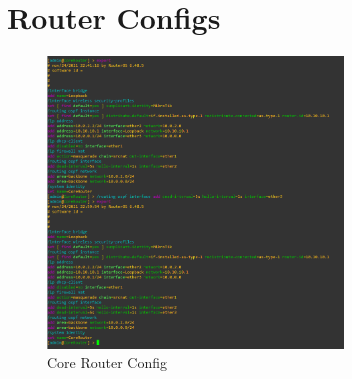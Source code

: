 \documentclass{article}
\begin{document}
	\section{Router Configs}
		\begin{figure}[h!]
			\centering
			\includegraphics[width=0.7\textwidth]{core_router_config}
			\caption{Core Router Config}
		\end{figure}
\end{document}
